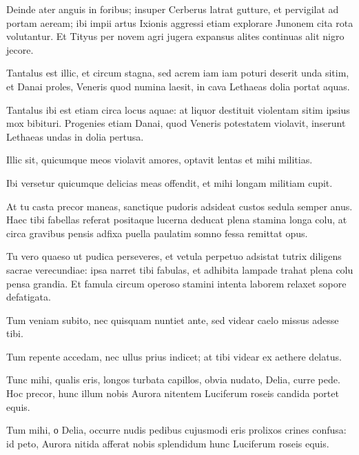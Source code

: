 \noindent Deinde ater anguis in foribus; insuper Cerberus latrat gutture, et pervigilat ad portam aeream; ibi impii artus Ixionis aggressi etiam explorare Junonem cita rota volutantur. Et Tityus per novem agri jugera expansus alites continuas alit nigro jecore. \\



{\large

\noindent Tantalus est illic, et circum stagna, sed acrem iam iam poturi deserit unda sitim, et Danai proles, Veneris quod numina laesit, in cava Lethaeas dolia portat aquas.\\

}


\noindent Tantalus ibi est etiam circa locus aquae: at liquor destituit violentam sitim ipsius mox bibituri. Progenies etiam Danai, quod Veneris potestatem violavit, inserunt Lethaeas undas in dolia pertusa. \\

\newpage

{\large

\noindent Illic sit, quicumque meos violavit amores, optavit lentas et mihi militias.\\

}


\noindent Ibi versetur quicumque delicias meas offendit, et mihi longam militiam cupit. \\

{\large

\noindent At tu casta precor maneas, sanctique pudoris adsideat custos sedula semper anus. Haec tibi fabellas referat positaque lucerna deducat plena stamina longa colu, at circa gravibus pensis adfixa puella paulatim somno fessa remittat opus.\\

}


\noindent Tu vero quaeso ut pudica perseveres, et vetula perpetuo adsistat tutrix diligens sacrae verecundiae: ipsa narret tibi fabulas, et adhibita lampade trahat plena colu pensa grandia. Et famula circum operoso stamini intenta laborem relaxet sopore defatigata. \\




{\large

\noindent Tum veniam subito, nec quisquam nuntiet ante, sed videar caelo missus adesse tibi.\\

}


\noindent Tum repente accedam, nec ullus prius indicet; at tibi videar ex aethere delatus. \\

{\large

\noindent Tunc mihi, qualis eris, longos turbata capillos, obvia nudato, Delia, curre pede. Hoc precor, hunc illum nobis Aurora nitentem Luciferum roseis candida portet equis.\\

}


\noindent Tum mihi, о Delia, occurre nudis pedibus cujusmodi eris prolixos crines confusa: id peto, Aurora nitida afferat nobis splendidum hunc Luciferum roseis equis.\\

